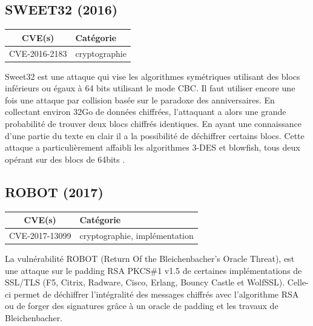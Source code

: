 

\subsection{SWEET32 (2016)}

\begin{tabularx}{0.96\textwidth}{|c|X|}
  \hline
  \textbf{CVE(s)} & \textbf{Catégorie} \\
  \hline
  CVE-2016-2183 & cryptographie \\
  \hline
\end{tabularx}

\vspace{1em}

Sweet32 est une attaque qui vise les algorithmes symétriques utilisant des blocs inférieurs ou égaux à 64 bits utilisant le mode CBC. Il faut utiliser encore une fois une attaque par collision basée sur le paradoxe des anniversaires. En collectant environ 32Go de données chiffrées, l'attaquant a alors une grande probabilité de trouver deux blocs chiffrés identiques. En ayant une connaissance d'une partie du texte en clair il a la possibilité de déchiffrer certains blocs. Cette attaque a particulièrement affaibli les algorithmes 3-DES et blowfish, tous deux opérant sur des blocs de 64bits \cite{sweet32}.




\subsection{ROBOT (2017)}

\begin{tabularx}{0.96\textwidth}{|c|X|}
  \hline
  \textbf{CVE(s)} & \textbf{Catégorie} \\
  \hline
  CVE-2017-13099 & cryptographie, implémentation \\
  \hline
\end{tabularx}

\vspace{1em}

La vulnérabilité ROBOT (Return Of the Bleichenbacher's Oracle Threat), est une attaque sur le padding RSA PKCS\#1 v1.5 de certaines implémentations de SSL/TLS (F5, Citrix, Radware, Cisco, Erlang, Bouncy Castle et WolfSSL). Celle-ci permet de déchiffrer l'intégralité des messages chiffrés avec l'algorithme RSA ou de forger des signatures grâce à un oracle de padding et les travaux de Bleichenbacher\cite{robot}.


